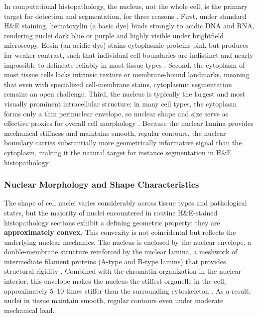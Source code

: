 In computational histopathology, the nucleus, not the whole cell, is the primary target for detection and segmentation, for three reasons \cite{irshad2014methods,xing2016robust}. First, under standard H\&E staining, hematoxylin (a basic dye) binds strongly to acidic DNA and RNA, rendering nuclei dark blue or purple and highly visible under brightfield microscopy. Eosin (an acidic dye) stains cytoplasmic proteins pink but produces far weaker contrast, such that individual cell boundaries are indistinct and nearly impossible to delineate reliably in most tissue types \cite{feldman2014he}. Second, the cytoplasm of most tissue cells lacks intrinsic texture or membrane-bound landmarks, meaning that even with specialized cell-membrane stains, cytoplasmic segmentation remains an open challenge. Third, the nucleus is typically the largest and most visually prominent intracellular structure; in many cell types, the cytoplasm forms only a thin perinuclear envelope, so nuclear shape and size serve as effective proxies for overall cell morphology \cite{lammerding2011mechanics}. Because the nuclear lamina provides mechanical stiffness and maintains smooth, regular contours, the nuclear boundary carries substantially more geometrically informative signal than the cytoplasm, making it the natural target for instance segmentation in H\&E histopathology.

\subsubsection{Nuclear Morphology and Shape Characteristics}
\label{sec:nuclear-morphology}

The shape of cell nuclei varies considerably across tissue types and pathological states, but the majority of nuclei encountered in routine H\&E-stained histopathology sections exhibit a defining geometric property: they are \textbf{approximately convex}. This convexity is not coincidental but reflects the underlying nuclear mechanics. The nucleus is enclosed by the nuclear envelope, a double-membrane structure reinforced by the nuclear lamina, a meshwork of intermediate filament proteins (A-type and B-type lamins) that provides structural rigidity \cite{lammerding2011mechanics}. Combined with the chromatin organization in the nuclear interior, this envelope makes the nucleus the stiffest organelle in the cell, approximately 5--10 times stiffer than the surrounding cytoskeleton \cite{lammerding2011mechanics}. As a result, nuclei in tissue maintain smooth, regular contours even under moderate mechanical load.

